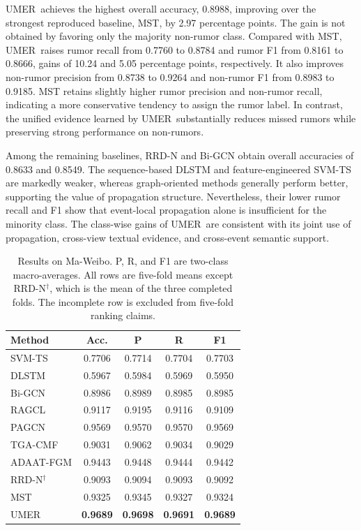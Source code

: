 \documentclass[sigconf,anonymous,review]{../acmart/acmart}
\newcommand{\method}{\textsc{UMER}}
\begin{document}
\method\ achieves the highest overall accuracy, 0.8988, improving over the
strongest reproduced baseline, MST, by 2.97 percentage points.  The gain is
not obtained by favoring only the majority non-rumor class.  Compared with
MST, \method\ raises rumor recall from 0.7760 to 0.8784 and rumor F1 from
0.8161 to 0.8666, gains of 10.24 and 5.05 percentage points, respectively.
It also improves non-rumor precision from 0.8738 to 0.9264 and non-rumor F1
from 0.8983 to 0.9185.  MST retains slightly higher rumor precision and
non-rumor recall, indicating a more conservative tendency to assign the rumor
label.  In contrast, the unified evidence learned by \method\ substantially
reduces missed rumors while preserving strong performance on non-rumors.

Among the remaining baselines, RRD-N and Bi-GCN obtain overall accuracies of
0.8633 and 0.8549.  The sequence-based DLSTM and feature-engineered SVM-TS are
markedly weaker, whereas graph-oriented methods generally perform better,
supporting the value of propagation structure.  Nevertheless, their lower
rumor recall and F1 show that event-local propagation alone is insufficient
for the minority class.  The class-wise gains of \method\ are consistent with
its joint use of propagation, cross-view textual evidence, and cross-event
semantic support.

\begin{table}[t]
  \caption{Results on Ma-Weibo. P, R, and F1 are two-class macro-averages.
  All rows are five-fold means except RRD-N$^{\dagger}$, which is the mean of
  the three completed folds. The incomplete row is excluded from five-fold
  ranking claims.}
  \label{tab:maweibo-results}
  \centering
  \small
  \setlength{\tabcolsep}{3.6pt}
  \begin{tabular}{@{}lcccc@{}}
    \toprule
    Method & Acc. & P & R & F1 \\
    \midrule
    SVM-TS       & 0.7706 & 0.7714 & 0.7704 & 0.7703 \\
    DLSTM        & 0.5967 & 0.5984 & 0.5969 & 0.5950 \\
    Bi-GCN       & 0.8986 & 0.8989 & 0.8985 & 0.8985 \\
    RAGCL        & 0.9117 & 0.9195 & 0.9116 & 0.9109 \\
    PAGCN        & 0.9569 & 0.9570 & 0.9570 & 0.9569 \\
    TGA-CMF      & 0.9031 & 0.9062 & 0.9034 & 0.9029 \\
    ADAAT-FGM    & 0.9443 & 0.9448 & 0.9444 & 0.9442 \\
    RRD-N$^{\dagger}$ & 0.9093 & 0.9094 & 0.9093 & 0.9092 \\
    MST           & 0.9325 & 0.9345 & 0.9327 & 0.9324 \\
    \midrule
    \method       & \textbf{0.9689} & \textbf{0.9698} &
                    \textbf{0.9691} & \textbf{0.9689} \\
    \bottomrule
  \end{tabular}
\end{table}
\end{document}
